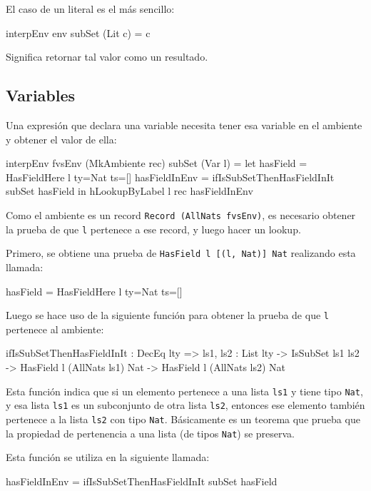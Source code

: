 El caso de un literal es el más sencillo:

\begin{code}
interpEnv env subSet (Lit c) = c
\end{code}

Significa retornar tal valor como un resultado.

\subsection{Variables}

Una expresión que declara una variable necesita tener esa variable en el ambiente y obtener el valor de ella:

\begin{code}
interpEnv {fvsEnv} (MkAmbiente rec) subSet (Var l) =
  let hasField = HasFieldHere {l} {ty=Nat} {ts=[]}
    hasFieldInEnv = ifIsSubSetThenHasFieldInIt subSet hasField
  in hLookupByLabel l rec hasFieldInEnv
\end{code}

Como el ambiente es un record \texttt{Record (AllNats fvsEnv)}, es necesario obtener la prueba de que \texttt{l} pertenece a ese record, y luego hacer un lookup.

Primero, se obtiene una prueba de \texttt{HasField l [(l, Nat)] Nat} realizando esta llamada:

\begin{code}
hasField = HasFieldHere {l} {ty=Nat} {ts=[]}
\end{code}

Luego se hace uso de la siguiente función para obtener la prueba de que \texttt{l} pertenece al ambiente:

\begin{code}
ifIsSubSetThenHasFieldInIt : DecEq lty => {ls1, ls2 : List lty} ->
  IsSubSet ls1 ls2 -> HasField l (AllNats ls1) Nat ->
  HasField l (AllNats ls2) Nat
\end{code}

Esta función indica que si un elemento pertenece a una lista \texttt{ls1} y tiene tipo \texttt{Nat}, y esa lista \texttt{ls1} es un subconjunto de otra lista \texttt{ls2}, entonces ese elemento también pertenece a la lista \texttt{ls2} con tipo \texttt{Nat}. Básicamente es un teorema que prueba que la propiedad de pertenencia a una lista (de tipos \texttt{Nat}) se preserva.

Esta función se utiliza en la siguiente llamada:

\begin{code}
hasFieldInEnv = ifIsSubSetThenHasFieldInIt subSet hasField
\end{code}

